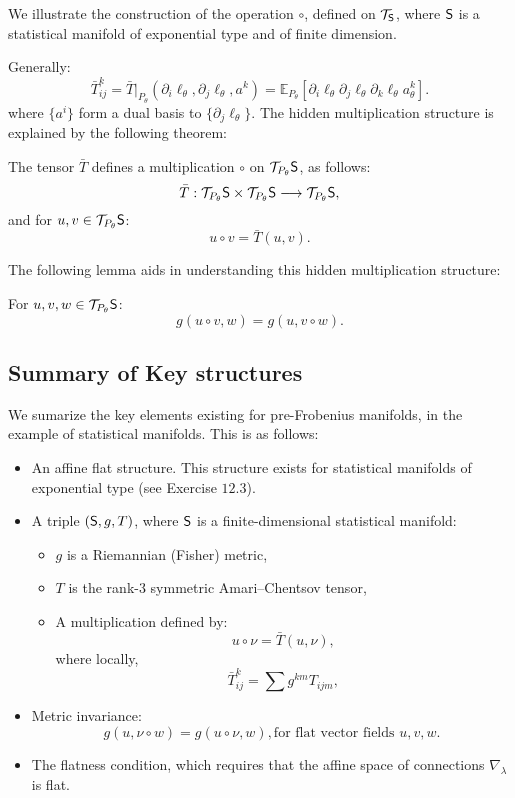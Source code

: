 We illustrate the construction of the operation $\circ$, defined on $\mathcal{T}_{\mathsf{S}}$, where $\mathsf{S}$ is a statistical manifold of exponential type and of finite dimension. 

Generally:
\[
\bar{T}_{ij}^k = \bar{T} \big|_{P_{\theta}} (\partial_i \ell_{\theta}, \partial_j \ell_{\theta}, a^k) = \mathbb{E}_{P_{\theta}} [\partial_i \ell_{\theta} \partial_j \ell_{\theta} \partial_k \ell_{\theta} a_{\theta}^k].
\]
where $\{a^i\}$ form a dual basis to $\{\partial_j\ell_{\theta}\}$.
The hidden multiplication structure is explained by the following theorem:

\begin{theorem}
The tensor $\bar{T}$ defines a multiplication $\circ$ on $\mathcal{T}_{P_{\theta}} \mathsf{S}$, as follows:
\[
\bar{T}: \mathcal{T}_{P_{\theta}}\mathsf{S} \times \mathcal{T}_{P_{\theta}}\mathsf{S} \longrightarrow \mathcal{T}_{P_{\theta}}\mathsf{S},
\]
and for $u, v \in \mathcal{T}_{P_{\theta}}\mathsf{S}$:
\[
u \circ v = \bar{T}(u, v).
\]
\end{theorem}

The following lemma aids in understanding this hidden multiplication structure:

\begin{lemma}
For $u, v, w \in \mathcal{T}_{P_{\theta}}\mathsf{S}$:
\[
g(u \circ v, w) = g(u, v \circ w).
\]
\end{lemma}


\subsection{Summary of Key structures} 

We sumarize the key elements existing for pre-Frobenius manifolds, in the example of statistical manifolds. This is as follows:
\begin{itemize}
    \item An affine flat structure. This structure exists for statistical manifolds of exponential type (see Exercise $12.3$).
    \item A triple $(\mathsf{S}, g, T)$, where $\mathsf{S}$ is a finite-dimensional statistical manifold:
    \begin{itemize}
        \item $g$ is a Riemannian (Fisher) metric,
        \item $T$ is the rank-3 symmetric Amari–Chentsov tensor,
        \item A multiplication defined by:
        \[
        u \circ \nu = \bar{T}(u, \nu),
        \]
        where locally, 
        \[
        \bar{T}_{ij}^k = \sum g^{km} T_{ijm},
        \]
            \end{itemize}
        \item Metric invariance:
        \[
        g(u, \nu \circ w) = g(u \circ \nu, w), \text{for flat vector fields } u,v,w.
        \]
        \item The flatness condition, which requires that the affine space of connections $\nabla_{\lambda}$ is flat.

\end{itemize}


